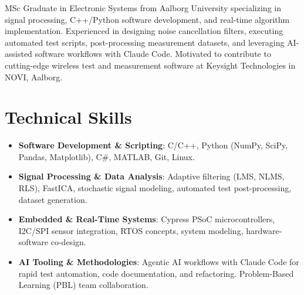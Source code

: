 \documentclass[11pt,a4paper,sans]{moderncv}
\begin{document}
\makecvtitle


\vspace{6pt}
\small{MSc Graduate in Electronic Systems from Aalborg University specializing in signal processing, C++/Python software development, and real-time algorithm implementation. Experienced in designing noise cancellation filters, executing automated test scripts, post-processing measurement datasets, and leveraging AI-assisted software workflows with Claude Code. Motivated to contribute to cutting-edge wireless test and measurement software at Keysight Technologies in NOVI, Aalborg.}


\section{Technical Skills}
\vspace{1pt}
\begin{itemize}

\item \textbf{Software Development \& Scripting}: C/C++, Python (NumPy, SciPy, Pandas, Matplotlib), C\#, MATLAB, Git, Linux.

\item \textbf{Signal Processing \& Data Analysis}: Adaptive filtering (LMS, NLMS, RLS), FastICA, stochastic signal modeling, automated test post-processing, dataset generation.

\item \textbf{Embedded \& Real-Time Systems}: Cypress PSoC microcontrollers, I2C/SPI sensor integration, RTOS concepts, system modeling, hardware-software co-design.

\item \textbf{AI Tooling \& Methodologies}: Agentic AI workflows with Claude Code for rapid test automation, code documentation, and refactoring. Problem-Based Learning (PBL) team collaboration.

\end{itemize}

\end{document}
